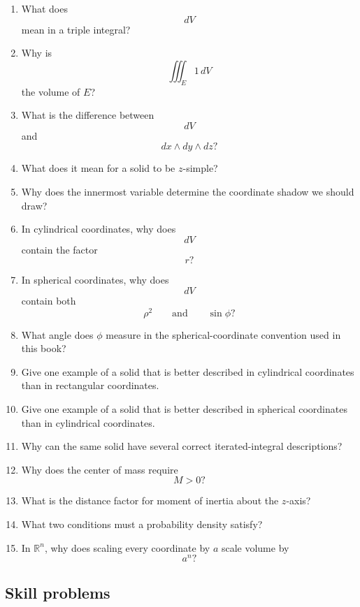\begin{enumerate}
\item What does
\[
    dV
\]
mean in a triple integral?

\item Why is
\[
    \iiint_E 1\,dV
\]
the volume of \(E\)?

\item What is the difference between
\[
    dV
\]
and
\[
    dx\wedge dy\wedge dz?
\]

\item What does it mean for a solid to be \(z\)-simple?

\item Why does the innermost variable determine the coordinate shadow we should draw?

\item In cylindrical coordinates, why does
\[
    dV
\]
contain the factor
\[
    r?
\]

\item In spherical coordinates, why does
\[
    dV
\]
contain both
\[
    \rho^2
    \qquad\text{and}\qquad
    \sin\phi?
\]

\item What angle does \(\phi\) measure in the spherical-coordinate convention used in this
book?

\item Give one example of a solid that is better described in cylindrical coordinates than
in rectangular coordinates.

\item Give one example of a solid that is better described in spherical coordinates than
in cylindrical coordinates.

\item Why can the same solid have several correct iterated-integral descriptions?

\item Why does the center of mass require
\[
    M>0?
\]

\item What is the distance factor for moment of inertia about the \(z\)-axis?

\item What two conditions must a probability density satisfy?

\item In \(\mathbb R^n\), why does scaling every coordinate by \(a\) scale volume by
\[
    a^n?
\]
\end{enumerate}

\subsection{Skill problems}

